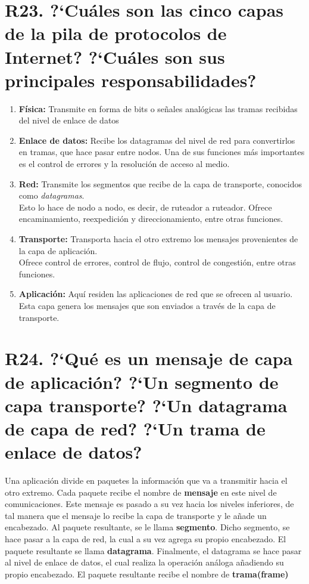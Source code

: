 \documentclass[a4paper, 11pt]{article}
\theoremstyle{definition} \theoremstyle{remark}
\begin{document}
     \section{R23. ?`Cu\'ales son las cinco capas de la pila de protocolos de Internet? ?`Cu\'ales son sus principales responsabilidades?}
     \begin{enumerate}
       \item \textbf{F\'isica:} Transmite en forma de bits o se\~{n}ales anal\'ogicas las tramas recibidas del nivel de enlace de datos
       \item \textbf{Enlace de datos:} Recibe los datagramas del nivel de red para convertirlos en tramas, que hace pasar entre nodos. Una de sus funciones m\'as importantes es el control de errores y la resoluci\'on de acceso al medio.
       \item \textbf{Red:} Transmite los segmentos que recibe de la capa de transporte, conocidos como \textit{datagramas}. \\
           Esto lo hace de nodo a nodo, es decir, de ruteador a ruteador. Ofrece encaminamiento, reexpedici\'on y direccionamiento, entre otras funciones.
       \item \textbf{Transporte:} Transporta hacia el otro extremo los mensajes provenientes de la capa de aplicaci\'on.\\
           Ofrece control de errores, control de flujo, control de congesti\'on, entre otras funciones.
       \item \textbf{Aplicaci\'on:} Aqu\'i residen las aplicaciones de red que se ofrecen al usuario. Esta capa genera los mensajes que son enviados a trav\'es de la capa de transporte.
     \end{enumerate}

     \section{R24. ?`Qu\'e es un mensaje de capa de aplicaci\'on? ?`Un segmento de capa transporte? ?`Un datagrama de capa de red? ?`Un trama de enlace de datos?}
     Una aplicaci\'on divide en paquetes la informaci\'on que va a transmitir hacia el otro extremo. Cada paquete recibe el nombre de \textbf{mensaje} en este nivel de comunicaciones. Este mensaje es pasado a su vez hacia los niveles inferiores, de tal manera que el mensaje lo recibe la capa de transporte y le a\~{n}ade un encabezado. Al paquete resultante, se le llama \textbf{segmento}. Dicho segmento, se hace pasar a la capa de red, la cual a su vez agrega su propio encabezado. El paquete resultante se llama \textbf{datagrama}. Finalmente, el datagrama se hace pasar al nivel de enlace de datos, el cual realiza la operaci\'on an\'aloga a\~{n}adiendo su propio encabezado. El paquete resultante recibe el nombre de \textbf{trama(frame)}
\end{document}
